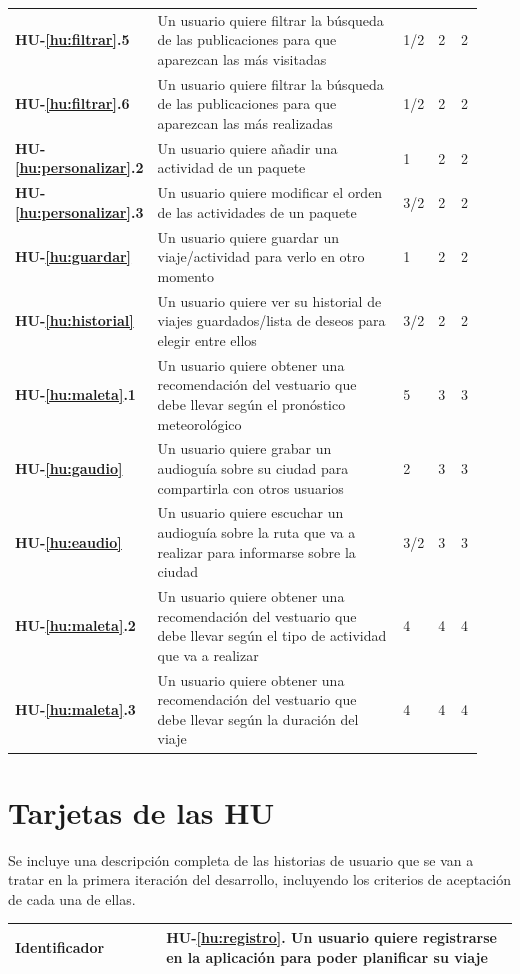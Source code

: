 \documentclass[11pt]{article}
\begin{document}
\begin{longtable}{p{0.13\linewidth}p{0.65\linewidth}p{0.05\linewidth}p{0.05\linewidth}p{0.05\linewidth}}
	\textbf{HU-\ref{hu:filtrar}.5} & Un usuario quiere filtrar la búsqueda de las publicaciones para que aparezcan las más visitadas & 1/2 & 2 & 2\\ 
	\textbf{HU-\ref{hu:filtrar}.6} & Un usuario quiere filtrar la búsqueda de las publicaciones para que aparezcan las más realizadas & 1/2 & 2 & 2\\
	\textbf{HU-\ref{hu:personalizar}.2} & Un usuario quiere añadir una actividad de un paquete & 1 & 2 & 2 \\ 
	\textbf{HU-\ref{hu:personalizar}.3} & Un usuario quiere modificar el orden de las actividades de un paquete & 3/2 & 2 & 2 \\
	\textbf{HU-\ref{hu:guardar}} & Un usuario quiere guardar un viaje/actividad para verlo en otro momento & 1 & 2 & 2\\ 
	\textbf{HU-\ref{hu:historial}} & Un usuario quiere ver su historial de viajes guardados/lista de deseos para elegir entre ellos & 3/2 & 2 & 2\\
	\textbf{HU-\ref{hu:maleta}.1} & Un usuario quiere obtener una recomendación del vestuario que debe llevar según el pronóstico meteorológico & 5 & 3 & 3\\
	\textbf{HU-\ref{hu:gaudio}} & Un usuario quiere grabar un audioguía sobre su ciudad para compartirla con otros usuarios & 2 & 3 & 3\\
	\textbf{HU-\ref{hu:eaudio}} & Un usuario quiere escuchar un audioguía sobre la ruta que va a realizar para informarse sobre la ciudad & 3/2 & 3 & 3\\
	\textbf{HU-\ref{hu:maleta}.2} & Un usuario quiere obtener una recomendación del vestuario que debe llevar según el tipo de actividad que va a realizar & 4 & 4 & 4\\
	\textbf{HU-\ref{hu:maleta}.3} & Un usuario quiere obtener una recomendación del vestuario que debe llevar según la duración del viaje & 4 & 4 & 4\\
	\bottomrule
\end{longtable}


\section{Tarjetas de las HU}
Se incluye una descripción completa de las historias de usuario que se van a tratar en la primera iteración del desarrollo, incluyendo los criterios de aceptación de cada una de ellas.

  \centering
  \begin{longtable}{p{0.3\linewidth}|p{0.7\linewidth}}
    \toprule
    \toprule
    \textbf{Identificador} & \textbf{HU-\ref{hu:registro}}. Un usuario quiere registrarse en la aplicación para poder planificar su viaje\\
    \bottomrule
  \end{longtable}
\end{document}
